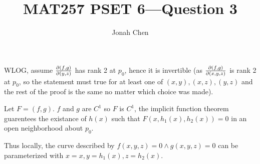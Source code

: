 \documentclass{exam}
\title{MAT257 PSET 6---Question 3}
\author{Jonah Chen}
\numberwithin{equation}{section}
\begin{document}
    \sffamily
    \maketitle
    WLOG, assume $\partialderivative{(f,g)}{(y,z)}$ has rank 2 at $p_0$, hence it is invertible (as $\partialderivative{(f,g)}{(x,y,z)}$ is rank 2 at $p_0$, so the statement must true for at least one of $(x,y), (x,z), (y,z)$ and the rest of the proof is the same no matter which choice was made).
    
    Let $F=(f,g)$. $f$ and $g$ are $C^1$ so $F$ is $C^1$, the implicit function theorem guarentees the existance of $h(x)$ such that $F(x,h_1(x),h_2(x))=0$ in an open neighborhood about $p_0$.

    Thus locally, the curve described by $f(x,y,z)=0\land g(x,y,z)=0$ can be parameterized with $x=x, y=h_1(x), z=h_2(x)$.
\end{document}
